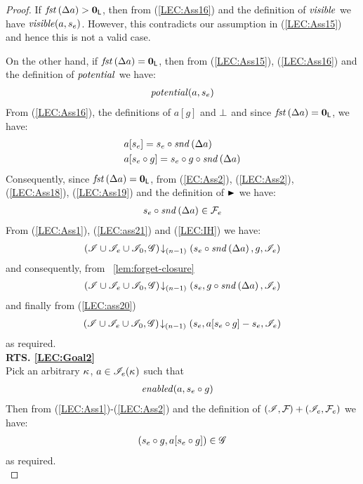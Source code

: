 \begin{lemma}
\begin{proof}
If $\mathit{fst}\left(\Delta {a}\right) > \mathbf{0}_{\textsf{L}}$, then from (\ref{LEC:Ass16}) and the definition of $\mathit{visible}$ we have $\mathit{visible}(a, s_e)$. However, this contradicts our assumption in (\ref{LEC:Ass15}) and hence this is not a valid case.

On the other hand, if $\mathit{fst}\left(\Delta {a}\right) = \mathbf{0}_{\textsf{L}}$, then from (\ref{LEC:Ass15}), (\ref{LEC:Ass16}) and the definition of $\mathit{potential}$ we have:
%
\begin{align}
	\mathit{potential}(a, s_e) \label{LEC:Ass18}
\end{align}
%
From (\ref{LEC:Ass16}), the definitions of $a[g]$ and $\mathrel{\bot}$ and since $\mathit{fst}\left(\Delta {a}\right) = \mathbf{0}_{\textsf{L}}$, we have: 
%
\begin{align}
	& a[s_e] = s_e \circ \mathit{snd}\left(\Delta {a}\right) \label{LEC:Ass19}\\
	& a[s_e \circ g] = s_e \circ g \circ \mathit{snd}\left(\Delta {a}\right) \label{LEC:ass20}
\end{align}
%
Consequently, since $\mathit{fst}\left(\Delta {a}\right) = \mathbf{0}_{\textsf{L}}$, from (\ref{EC:Ass2}), (\ref{LEC:Ass2}), (\ref{LEC:Ass18}), (\ref{LEC:Ass19}) and the definition of $\strictfences$ we have:
%
\begin{align}
	s_e \circ \mathit{snd}\left(\Delta {a}\right) \in \mathcal{F}_{e}  \label{LEC:ass21}
\end{align}
%
From (\ref{LEC:Ass1}), (\ref{LEC:ass21}) and (\ref{LEC:IH}) we have:
%
\begin{align*}
	\left(\mathscr{I} \cup \mathscr{I}_{e} \cup \mathscr{I}_0, \mathscr{G}\right) \!\downarrow_{(n-1)} \left(s_e \circ \mathit{snd}\left(\Delta {a}\right), g, \mathscr{I}_e\right)
\end{align*}
%
and consequently, from \lem~\ref{lem:forget-closure}
%
\begin{align*}
	\left(\mathscr{I} \cup \mathscr{I}_{e} \cup \mathscr{I}_0, \mathscr{G}\right) \!\downarrow_{(n-1)} \left(s_e, g \circ \mathit{snd}\left(\Delta {a}\right), \mathscr{I}_e\right)
\end{align*}
%
and finally from (\ref{LEC:ass20})
%
\begin{align*}
	\left(\mathscr{I} \cup \mathscr{I}_{e} \cup \mathscr{I}_0, \mathscr{G}\right) \!\downarrow_{(n-1)} \left(s_e, a[s_e  \circ g] - s_e, \mathscr{I}_e\right)
\end{align*}
%
as required.\\
%
%
%

\noindent\textbf{RTS. \ref{LEC:Goal2}}\\
Pick an arbitrary $\kappa_{}$, $a \in \mathscr{I}_e(\kappa_{})$ such that
%
\begin{align}
	& \mathit{enabled}(a, s_e \circ g) \label{LEC:Ass20}
\end{align}
Then from (\ref{LEC:Ass1})-(\ref{LEC:Ass2}) and the definition of $(\mathscr{I}, \mathcal{F}_{}) + (\mathscr{I}_e, \mathcal{F}_{e})$ we have:
%
\begin{align*}
	(s_e \circ g, a[s_e \circ g]) \in \mathscr{G}
\end{align*}
%
as required.\\
%
%
%


\end{proof}
\end{lemma}
